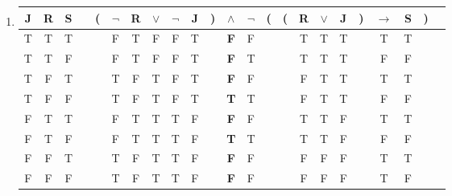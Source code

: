 \begin{enumerate}
	\item
	      \begin{tabular}{@{ }c@{ }@{ }c@{ }@{ }c | c@{ }@{}c@{}@{ }c@{ }@{ }c@{ }@{ }c@{ }@{ }c@{ }@{ }c@{ }@{}c@{}@{ }c@{ }@{ }c@{ }@{}c@{}@{}c@{}@{ }c@{ }@{ }c@{ }@{ }c@{ }@{}c@{}@{ }c@{ }@{ }c@{ }@{}c@{}@{ }c}
		      J & R & S &  & ( & $\lnot$ & R & $\lor$ & $\lnot$ & J & ) & $\land$    & $\lnot$ & ( & ( & R & $\lor$ & J & ) & $\rightarrow$ & S & ) & \\
		      \hline
		      T & T & T &  &   & F       & T & F      & F       & T &   & \textbf{F} & F       &   &   & T & T      & T &   & T             & T &   & \\
		      T & T & F &  &   & F       & T & F      & F       & T &   & \textbf{F} & T       &   &   & T & T      & T &   & F             & F &   & \\
		      T & F & T &  &   & T       & F & T      & F       & T &   & \textbf{F} & F       &   &   & F & T      & T &   & T             & T &   & \\
		      T & F & F &  &   & T       & F & T      & F       & T &   & \textbf{T} & T       &   &   & F & T      & T &   & F             & F &   & \\
		      F & T & T &  &   & F       & T & T      & T       & F &   & \textbf{F} & F       &   &   & T & T      & F &   & T             & T &   & \\
		      F & T & F &  &   & F       & T & T      & T       & F &   & \textbf{T} & T       &   &   & T & T      & F &   & F             & F &   & \\
		      F & F & T &  &   & T       & F & T      & T       & F &   & \textbf{F} & F       &   &   & F & F      & F &   & T             & T &   & \\
		      F & F & F &  &   & T       & F & T      & T       & F &   & \textbf{F} & F       &   &   & F & F      & F &   & T             & F &   & \\
	      \end{tabular}


\end{enumerate}
